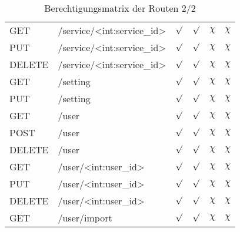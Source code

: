 \begin{table}
\begin{tabular}{l l c c c c}
		GET		& /service/<int:service\_id>		& $\surd$ & $\surd$ & $\chi$ & $\chi$ \\
		PUT		& /service/<int:service\_id>		& $\surd$ & $\surd$ & $\chi$ & $\chi$ \\
		DELETE	& /service/<int:service\_id>		& $\surd$ & $\surd$ & $\chi$ & $\chi$ \\
		GET		& /setting							& $\surd$ & $\surd$ & $\chi$ & $\chi$ \\
		PUT		& /setting							& $\surd$ & $\surd$ & $\chi$ & $\chi$ \\
		GET		& /user								& $\surd$ & $\surd$ & $\chi$ & $\chi$ \\
		POST	& /user								& $\surd$ & $\surd$ & $\chi$ & $\chi$ \\
		DELETE	& /user								& $\surd$ & $\surd$ & $\chi$ & $\chi$ \\
		GET 	& /user/<int:user\_id>				& $\surd$ & $\surd$ & $\chi$ & $\chi$ \\
		PUT 	& /user/<int:user\_id>				& $\surd$ & $\surd$ & $\chi$ & $\chi$ \\
		DELETE	& /user/<int:user\_id>				& $\surd$ & $\surd$ & $\chi$ & $\chi$ \\
		GET		& /user/import						& $\surd$ & $\surd$ & $\chi$ & $\chi$ \\
	\end{tabular}
	\caption{Berechtigungsmatrix der Routen 2/2}
	\label{table:gis-permission-2}
\end{table}


